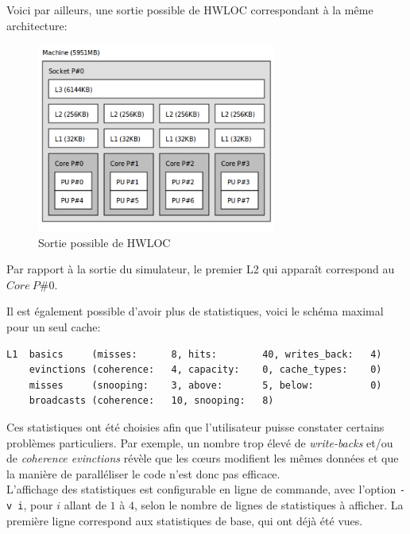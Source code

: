 Voici par ailleurs, une sortie possible de \textsf{HWLOC} correspondant à la même architecture: \\
\begin{figure}[H]
\begin{center}
   \includegraphics[width=0.7\textwidth]{images/lstopo.png}
   \caption{\label{img:archi_hwloc} Sortie possible de \textsf{HWLOC}}
\end{center}
\end{figure}

Par rapport à la sortie du simulateur, le premier L2 qui apparaît correspond au $Core \ P\#0$.

Il est également possible d'avoir plus de statistiques, voici le schéma maximal pour un seul cache:
\begin{lstlisting}
L1  basics     (misses:      8, hits:        40, writes_back:   4)
    evinctions (coherence:   4, capacity:    0, cache_types:    0)
    misses     (snooping:    3, above:       5, below:          0)
    broadcasts (coherence:   10, snooping:   8)
\end{lstlisting}


Ces statistiques ont été choisies afin que l'utilisateur puisse constater certains problèmes particuliers. Par exemple, un nombre trop élevé de \emph{write-backs} et/ou de \emph{coherence evinctions} révèle que les c\oe urs modifient les mêmes données et que la manière de paralléliser le code n'est donc pas efficace. \\

L'affichage des statistiques est configurable en ligne de commande, avec l'option \texttt{-v i}, pour $i$ allant de $1$ à $4$, selon le nombre de lignes de statistiques à afficher. La première ligne correspond aux statistiques de base, qui ont déjà été vues. \\

